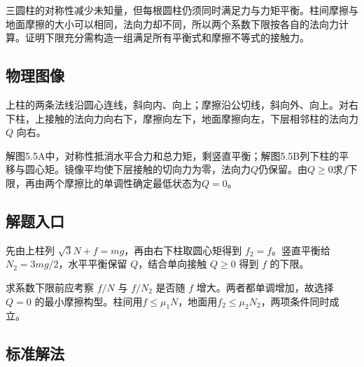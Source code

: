 \documentclass[UTF8,fontset=fandol,a4paper,11pt]{ctexart}
\begin{document}
三圆柱的对称性减少未知量，但每根圆柱仍须同时满足力与力矩平衡。柱间摩擦与地面摩擦的大小可以相同，法向力却不同，所以两个系数下限按各自的法向力计算。证明下限充分需构造一组满足所有平衡式和摩擦不等式的接触力。




\subsection*{物理图像}

上柱的两条法线沿圆心连线，斜向内、向上；摩擦沿公切线，斜向外、向上。对右下柱，上接触的法向力向右下，摩擦向左下，地面摩擦向左，下层相邻柱的法向力 $Q$ 向右。

解图5.5A中，对称性抵消水平合力和总力矩，剩竖直平衡；解图5.5B列下柱的平移与圆心矩。镜像平均使下层接触的切向力为零，法向力$Q$仍保留。由$Q\ge0$求$f$下限，再由两个摩擦比的单调性确定最低状态为$Q=0$。



\subsection*{解题入口}

先由上柱列 $\sqrt3N+f=mg$，再由右下柱取圆心矩得到 $f_2=f$。竖直平衡给 $N_2=3mg/2$，水平平衡保留 $Q$，结合单向接触 $Q\ge0$ 得到 $f$ 的下限。

求系数下限前应考察 $f/N$ 与 $f/N_2$ 是否随 $f$ 增大。两者都单调增加，故选择 $Q=0$ 的最小摩擦构型。柱间用$f\le\mu_1N$，地面用$f_2\le\mu_2N_2$，两项条件同时成立。



\subsection*{标准解法}
\end{document}

